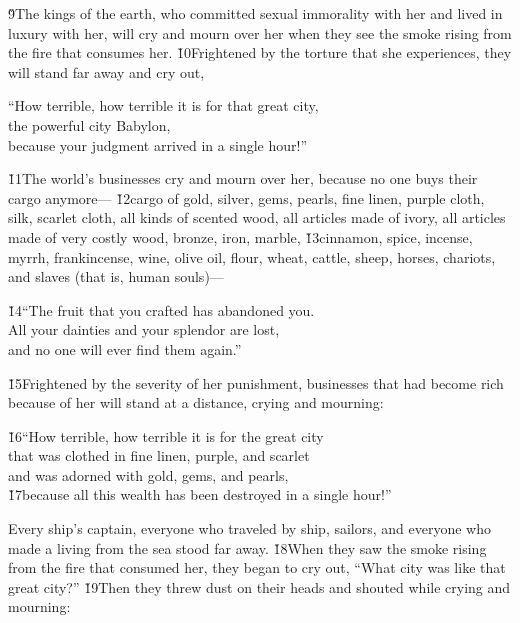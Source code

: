 \v{9}The kings of the earth, who committed sexual immorality with her and lived in luxury with her, will cry and mourn over her when they see the smoke rising from the fire that consumes her. \v{10}Frightened by the torture that she experiences, they will stand far away and cry out,

\begin{poetry}
\poeml ``How terrible, how terrible it is for that great city, \\
\poemll    the powerful city Babylon, \\
\poemlll       because your judgment arrived in a single hour!''
\end{poetry}

\v{11}The world's businesses cry and mourn over her, because no one buys their cargo anymore--- \v{12}cargo of gold, silver, gems, pearls, fine linen, purple cloth, silk, scarlet cloth, all kinds of scented wood, all articles made of ivory, all articles made of very costly wood, bronze, iron, marble, \v{13}cinnamon, spice, incense, myrrh, frankincense, wine, olive oil, flour, wheat, cattle, sheep, horses, chariots, and slaves (that is, human souls)---

\begin{poetry}
\poeml \v{14}``The fruit that you crafted has abandoned you. \\
\poemll    All your dainties and your splendor are lost, \\
\poemlll       and no one will ever find them again.''
\end{poetry}

\v{15}Frightened by the severity of her punishment, businesses that had become rich because of her will stand at a distance, crying and mourning:

\begin{poetry}
\poeml \v{16}``How terrible, how terrible it is for the great city \\
\poemll    that was clothed in fine linen, purple, and scarlet \\
\poemlll       and was adorned with gold, gems, and pearls, \\
\poeml \v{17}because all this wealth has been destroyed in a single hour!''
\end{poetry}

Every ship's captain, everyone who traveled by ship, sailors, and everyone who made a living from the sea stood far away. \v{18}When they saw the smoke rising from the fire that consumed her, they began to cry out, ``What city was like that great city?'' \v{19}Then they threw dust on their heads and shouted while crying and mourning:

